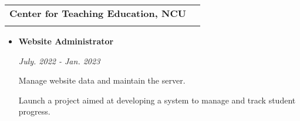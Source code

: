 \documentclass[a4paper,11pt]{article}
\makeatletter
\newcommand{\resumeSubheading}[4]{
\vspace{0.5mm}\item
    \begin{tabular*}{0.98\textwidth}[t]{l@{\extracolsep{\fill}}r}
        \textbf{#1} & \textit{\footnotesize{#4}} \\
        \textit{\footnotesize{#3}} &  \footnotesize{#2}\\
    \end{tabular*}
    \vspace{-2.4mm}
}
\newcommand{\resumeItemListStart}{\begin{justify}\begin{itemize}[leftmargin=3ex, rightmargin=2ex, noitemsep,labelsep=1.2mm,itemsep=0mm]\small}
\newcommand{\resumeItemListEnd}{\end{itemize}\end{justify}\vspace{-2mm}}
\makeatother
\begin{document}
    \resumeSubheading
    { Center for Teaching Education, NCU}{}
    {}{}
    \vspace{-4.0mm}
    \resumeItemListStart
    \begin{itemize}[leftmargin=0cm, itemsep=0cm, topsep=0cm]
    \item \parbox{\dimexpr\linewidth-4cm\relax}{\textbf{Website Administrator} }
          \textit{\footnotesize{\hfill July. 2022 - Jan. 2023}}

    \hspace{0.5cm}\parbox{\dimexpr\linewidth -1cm\relax}{\footnotesize{Manage website data and maintain the server.}}
     
     \hspace{0.5cm}\parbox{\dimexpr\linewidth -1cm\relax}{\footnotesize{Launch a project aimed at developing a system to manage and track student progress.}}

    \end{itemize}

    \resumeItemListEnd

    
    
    
      
\end{document}
